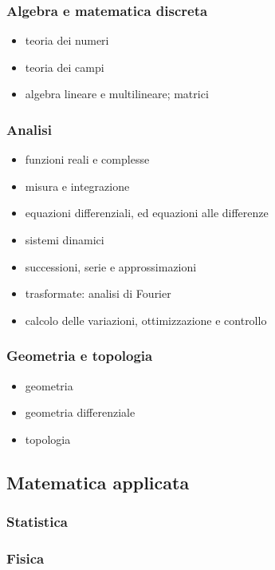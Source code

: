 \subsubsection{Algebra e matematica discreta}
\begin{itemize}
    \item teoria dei numeri
    \item teoria dei campi
    \item algebra lineare e multilineare; matrici
\end{itemize}

\subsubsection{Analisi}
\begin{itemize}
    \item funzioni reali e complesse
    \item misura e integrazione
    \item equazioni differenziali, ed equazioni alle differenze
    \item sistemi dinamici
    \item successioni, serie e approssimazioni
    \item trasformate: analisi di Fourier
    \item calcolo delle variazioni, ottimizzazione e controllo
\end{itemize}

\subsubsection{Geometria e topologia}
\begin{itemize}
    \item geometria
    \item geometria differenziale
    \item topologia
\end{itemize}

\subsection{Matematica applicata}
\subsubsection{Statistica}
\subsubsection{Fisica}
